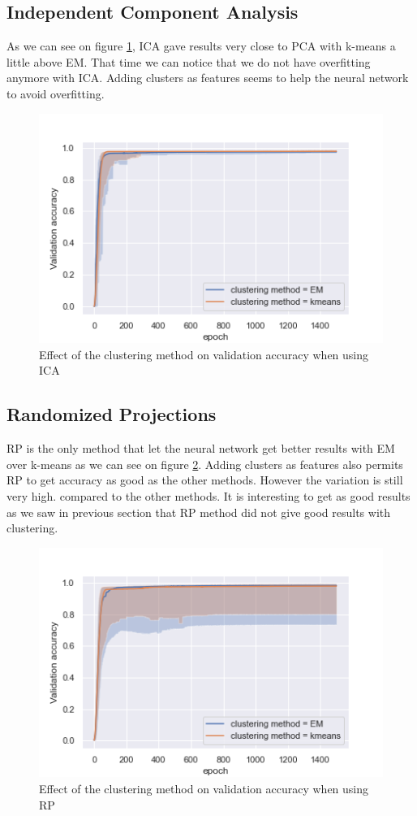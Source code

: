 \documentclass[twocolumn, 10pt]{article}
\begin{document}
		\subsection{Independent Component Analysis}
			As we can see on figure \ref{fig:clusper_ica_cm}, ICA gave results very close to PCA with k-means a little above EM. That time we can notice that we do not have overfitting anymore with ICA. Adding clusters as features seems to help the neural network to avoid overfitting.

			\begin{figure}[h]
				\centering
				\includegraphics[width=0.7\linewidth]{../graphics/clusper_ICA_epoch_val_categorical_accuracy_clustering_method.png}
				\caption{Effect of the clustering method on validation accuracy when using ICA}
				\label{fig:clusper_ica_cm}
			\end{figure}
		\subsection{Randomized Projections}
			RP is the only method that let the neural network get better results with EM over k-means as we can see on figure \ref{fig:clusper_rnd_cm}. Adding clusters as features also permits RP to get accuracy as good as the other methods. However the variation is still very high. compared to the other methods. It is interesting to get as good results as we saw in previous section that RP method did not give good results with clustering.

			\begin{figure}[h]
				\centering
				\includegraphics[width=0.7\linewidth]{../graphics/clusper_RP_epoch_val_categorical_accuracy_clustering_method.png}
				\caption{Effect of the clustering method on validation accuracy when using RP}
				\label{fig:clusper_rnd_cm}
			\end{figure}
\end{document}
